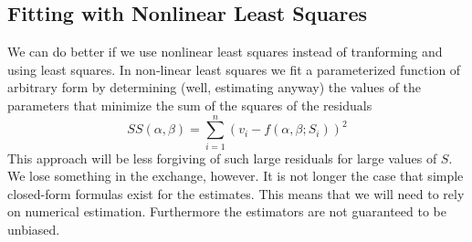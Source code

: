 \documentclass{article}
\begin{document}
\subsection{Fitting with Nonlinear Least Squares}
We can do better if we use nonlinear least squares instead of tranforming and using least
squares.  In non-linear least squares we fit a parameterized function of arbitrary form
by determining (well, estimating anyway) the values of the parameters that 
minimize the sum of the squares of the residuals
\[
SS(\alpha, \beta) = \sum_{i=1}^n ( v_i - f(\alpha, \beta; S_i) )^2
\]
This approach will be less forgiving of such large residuals for large values of $S$.
We lose something in the exchange, however.  It is not longer the case that simple
closed-form formulas exist for the estimates.  This means that we will need to rely
on numerical estimation.  
Furthermore the estimators are not guaranteed to be
unbiased.
\end{document}
